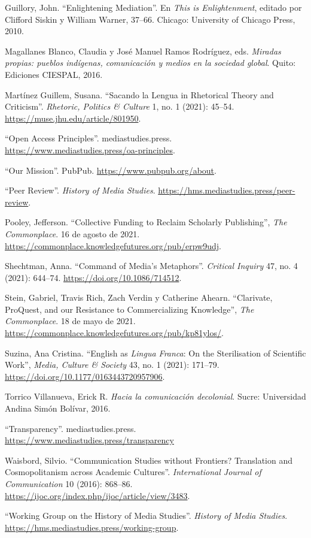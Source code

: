 \documentclass{tufte-handout}
\begin{document}
\begin{hangparas}{.25in}{1}
Guillory, John. ``Enlightening Mediation''. En \emph{This is
Enlightenment}, editado por Clifford Siskin y William Warner, 37--66.
Chicago: University of Chicago Press, 2010.

Magallanes Blanco, Claudia y José Manuel Ramos Rodríguez, eds.
\emph{Miradas propias: pueblos indígenas, comunicación y medios en la
sociedad global}. Quito: Ediciones CIESPAL, 2016.

Martínez Guillem, Susana. ``Sacando la Lengua in Rhetorical Theory and
Criticism''. \emph{Rhetoric, Politics \& Culture} 1, no. 1 (2021):
45--54. \url{https://muse.jhu.edu/article/801950}.

``Open Access Principles''. mediastudies.press.
\url{https://www.mediastudies.press/oa-principles}.

``Our Mission''. PubPub. \url{https://www.pubpub.org/about}.

``Peer Review''. \emph{History of Media Studies}.
\url{https://hms.mediastudies.press/peer-review}.

Pooley, Jefferson. ``Collective Funding to Reclaim Scholarly
Publishing'', \emph{The Commonplace}. 16 de agosto de 2021.
\url{https://commonplace.knowledgefutures.org/pub/erpw9udj}.

Shechtman, Anna. ``Command of Media's Metaphors''. \emph{Critical
Inquiry} 47, no. 4 (2021): 644--74.
\url{https://doi.org/10.1086/714512}.

Stein, Gabriel, Travis Rich, Zach Verdin y Catherine Ahearn.
``Clarivate, ProQuest, and our Resistance to Commercializing
Knowledge'', \emph{The Commonplace}. 18 de mayo de 2021.
\url{https://commonplace.knowledgefutures.org/pub/kp81ylos/}.

Suzina, Ana Cristina. ``English as \emph{Lingua Franca}: On the
Sterilisation of Scientific Work'', \emph{Media, Culture \& Society} 43,
no. 1 (2021): 171--79. \url{https://doi.org/10.1177/0163443720957906}.

Torrico Villanueva, Erick R. \emph{Hacia la comunicación decolonial}.
Sucre: Universidad Andina Simón Bolívar, 2016.

``Transparency''. mediastudies.press.
\url{https://www.mediastudies.press/transparency}

Waisbord, Silvio. ``Communication Studies without Frontiers? Translation
and Cosmopolitanism across Academic Cultures''. \emph{International
Journal of Communication} 10 (2016): 868--86.
\url{https://ijoc.org/index.php/ijoc/article/view/3483}.

``Working Group on the History of Media Studies''. \emph{History of
Media Studies}. \url{https://hms.mediastudies.press/working-group}.



\end{hangparas}
\end{document}
